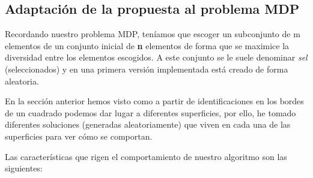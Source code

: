\subsection{Adaptación de la propuesta al problema MDP}


Recordando nuestro problema MDP, teníamos que escoger un subconjunto de m elementos de un conjunto inicial de \textbf{n} elementos de forma que se maximice la diversidad entre los elementos escogidos. A este conjunto se le suele denominar \textit{sel} (seleccionados) y en una primera versión implementada está creado de forma aleatoria.

En la sección anterior hemos visto como a partir de identificaciones en los bordes de un cuadrado podemos dar lugar a diferentes superficies, por ello, he tomado diferentes soluciones (generadas aleatoriamente) que viven en cada una de las superficies para ver cómo se comportan.


Las características que rigen el comportamiento de nuestro algoritmo son las siguientes:

